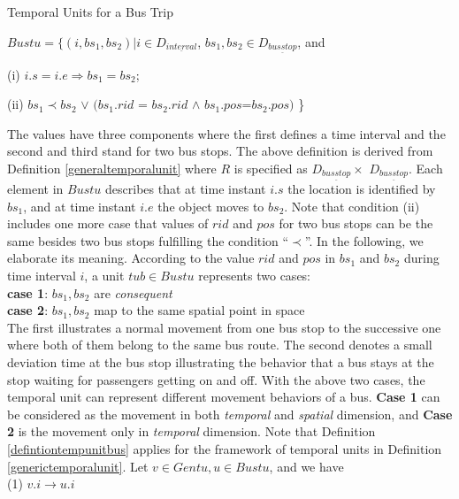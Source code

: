 \begin{Statement}
\label{defintiontempunitbus}
Temporal Units for a Bus Trip 

$Bustu = \{(i,bs_1,bs_2)| i \in D_{\underline{interval}}$, 
$bs_1,bs_2 \in D_{\underline{busstop}}$, and  

(i) $i.s = i.e \Rightarrow bs_1 = bs_2$;

(ii)  $bs_1 \prec bs_2$ $\vee$ $(bs_1.rid$ = $bs_2.rid$ $\wedge$ $bs_1.pos$=$bs_2.pos)$ \}
\end{Statement}

The values have three components where the first defines a time interval 
and the second and third stand for two bus stops. The above definition is derived from Definition 
\ref{generaltemporalunit} where $R$ is specified as $D_{\underline{busstop}}\times$
$D_{\underline{busstop}} $. Each element in $Bustu$ describes that at time 
instant $i.s$ the location is identified by $bs_1$, 
and at time instant $i.e$ the object moves to $bs_2$. Note that condition (ii) includes one
more case that values of $rid$ and $pos$ for two bus stops can be the same besides two bus stops fulfilling the condition ``$\prec$''. In the following, we elaborate its meaning. According to the value $rid$ and $pos$ in $bs_1$ and $bs_2$ during time interval $i$, 
a unit $tub \in Bustu$ represents two cases: \\

 \textbf{case 1}:  $bs_1,bs_2$ are \textit{consequent}\\

 \textbf{case 2}: $bs_1,bs_2$ map to the same spatial point in space\\


The first illustrates a normal movement from one bus stop to the successive one where
both of them belong to the same bus route. 
The second denotes a small deviation time at the bus stop illustrating 
the behavior that a bus stays at the stop waiting for passengers getting on 
and off. With the above two cases, the temporal unit can represent different movement behaviors of a bus. \textbf{Case 1} can be considered as the movement in both \textit{temporal} and \textit{spatial} dimension, and \textbf{Case 2} is the movement only in \textit{temporal} dimension. Note that Definition \ref{defintiontempunitbus} applies for the framework of temporal units in Definition \ref{generictemporalunit}. Let $v \in Gentu, u\in Bustu$, and we have \\

(1) $v.i\rightarrow u.i$ 


